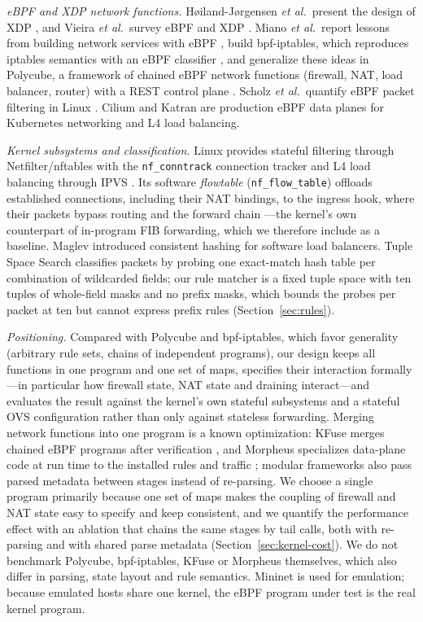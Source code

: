 \documentclass[conference]{IEEEtran}
\begin{document}
\textit{eBPF and XDP network functions.} H{\o}iland-J{\o}rgensen
\textit{et al.}\ present the design of XDP \cite{hoiland2018xdp}, and Vieira
\textit{et al.}\ survey eBPF and XDP \cite{vieira2020ebpf}. Miano
\textit{et al.}\ report lessons from building network services with eBPF
\cite{miano2018creating}, build bpf-iptables, which reproduces iptables
semantics with an eBPF classifier \cite{miano2019bpfiptables}, and generalize
these ideas in Polycube, a framework of chained eBPF network functions
(firewall, NAT, load balancer, router) with a REST control plane
\cite{miano2021polycube}. Scholz \textit{et al.}\ quantify eBPF packet
filtering in Linux \cite{scholz2018filtering}. Cilium \cite{cilium} and Katran
\cite{katran} are production eBPF data planes for Kubernetes networking and L4
load balancing.

\textit{Kernel subsystems and classification.} Linux provides stateful
filtering through Netfilter/nftables with the \texttt{nf\_conntrack}
connection tracker \cite{nftables} and L4 load balancing through IPVS
\cite{zhang2000lvs}. Its software \emph{flowtable} (\texttt{nf\_flow\_table})
offloads established connections, including their NAT bindings, to the
ingress hook, where their packets bypass routing and the forward chain
\cite{nfflowtable}---the kernel's own counterpart of in-program FIB
forwarding, which we therefore include as a baseline. Maglev \cite{eisenbud2016maglev} introduced consistent
hashing for software load balancers. Tuple Space Search
\cite{srinivasan1999tss} classifies packets by probing one exact-match hash
table per combination of wildcarded fields; our rule matcher is a fixed tuple
space with ten tuples of whole-field masks and no prefix masks, which bounds
the probes per packet at ten but cannot express prefix rules
(Section~\ref{sec:rules}).

\textit{Positioning.} Compared with Polycube and bpf-iptables, which favor
generality (arbitrary rule sets, chains of independent programs), our design
keeps all functions in one program and one set of maps, specifies their
interaction formally---in particular how firewall state, NAT state and
draining interact---and evaluates the result against the kernel's own
stateful subsystems and a stateful OVS configuration rather than only against
stateless forwarding. Merging network functions into one program is a
known optimization: KFuse merges chained eBPF programs after verification
\cite{kuo2022kfuse}, and Morpheus specializes data-plane code at run time to
the installed rules and traffic \cite{miano2022morpheus}; modular frameworks
also pass parsed metadata between stages instead of re-parsing. We choose a
single program primarily because one set of maps makes the coupling of
firewall and NAT state easy to specify and keep consistent, and we quantify
the performance effect with an ablation that chains the same stages by tail
calls, both with re-parsing and with shared parse metadata
(Section~\ref{sec:kernel-cost}). We do not benchmark Polycube, bpf-iptables,
KFuse or Morpheus themselves, which also differ in parsing, state layout and
rule semantics. Mininet \cite{lantz2010mininet} is used for emulation;
because emulated hosts share one kernel, the eBPF program under test is the
real kernel program.
\end{document}
